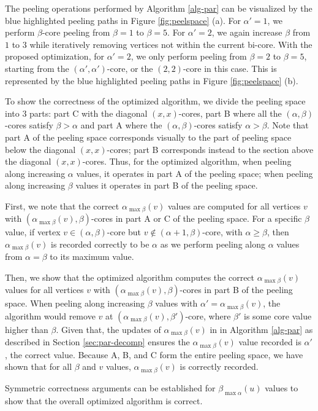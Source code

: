 The peeling operations performed by Algorithm \ref{alg-par} can be visualized by the blue highlighted peeling paths in Figure \ref{fig:peelspace} (a). For $\alpha'=1$, we perform $\beta$-core peeling from $\beta=1$ to $\beta=5$. For $\alpha'=2$, we again increase $\beta$ from $1$ to $3$ while iteratively removing vertices not within the current bi-core. With the proposed optimization, for $\alpha'=2$, we only perform peeling from $\beta=2$ to $\beta=5$, starting from the $(\alpha',\alpha')$-core, or the $(2,2)$-core in this case. This is represented by the blue highlighted peeling paths in Figure \ref{fig:peelspace} (b).

To show the correctness of the optimized algorithm, we divide the peeling space into $3$ parts: part C with the diagonal $(x,x)$-cores, part B where all the $(\alpha,\beta)$-cores satisfy $\beta>\alpha$ and part A where the $(\alpha,\beta)$-cores satisfy $\alpha>\beta$. Note that part A of the peeling space corresponds visually to the part of peeling space below the diagonal $(x,x)$-cores; part B corresponds instead to the section above the diagonal $(x,x)$-cores. Thus, for the optimized algorithm, when peeling along increasing $\alpha$ values, it operates in part A of the peeling space; when peeling along increasing $\beta$ values it operates in part B of the peeling space. 

First, we note that the correct $\alpha_{\max \beta}(v)$ values are computed for all vertices $v$ with $(\alpha_{\max \beta}(v), \beta)$-cores in part A or C of the peeling space. For a specific $\beta$ value, if vertex $v\in (\alpha,\beta)$-core but $v\not\in (\alpha+1,\beta)$-core, with $\alpha\ge \beta$, then $\alpha_{\max \beta}(v)$ is recorded correctly to be $\alpha$ as we perform peeling along $\alpha$ values from $\alpha = \beta$ to its maximum value. 

Then, we show that the optimized algorithm computes the correct $\alpha_{\max \beta}(v)$ values for all vertices $v$ with $(\alpha_{\max \beta}(v), \beta)$-cores in part B of the peeling space. When peeling along increasing $\beta$ values with $\alpha' = \alpha_{\max \beta}(v)$, the algorithm would remove $v$ at $(\alpha_{\max \beta}(v), \beta')$-core, where $\beta'$ is some core value higher than $\beta$.
Given that, the updates of $\alpha_{\max \beta}(v)$ in  in Algorithm \ref{alg-par} as described in Section \ref{sec:par-decomp} ensures the $\alpha_{\max \beta}(v)$ value recorded is $\alpha'$, the correct value. Because A, B, and C form the entire peeling space, we have shown that for all $\beta$ and $v$ values, $\alpha_{\max\beta}(v)$ is correctly recorded. 

Symmetric correctness arguments can be established for $\beta_{\max \alpha}(u)$ values to show that the overall optimized algorithm is correct. 

